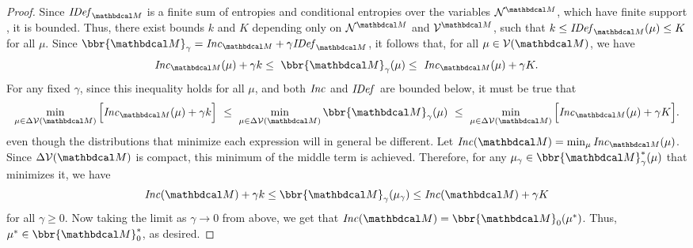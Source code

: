 \begin{proof}
Since $\IDef{\dg M}$ is a finite sum of entropies
and conditional entropies over the variables $\N^{\dg M}$, which have finite support%
, it is bounded.
Thus, there exist bounds $k$ and $K$ depending only on $\N^{\dg M}$ and
$\V^{\dg M}$, such that $\lb \leq \IDef{\dg M}(\mu) \leq \ub$ for all $\mu$.
%
Since $\bbr{\dg M}_\gamma = \Inc_{\dg M} + \gamma \IDef{\dg M}$,
it follows that, for all $\mu \in \V(\dg M)$, we have
\[ \Inc_{\dg M}( \mu) + \gamma\lb \leq~ \bbr{\dg M }_\gamma(\mu) 
\leq~  \Inc_{\dg M}( \mu) + \gamma\ub. \]
For any fixed $\gamma$, since this inequality holds for all $\mu$, and both $\mathit{Inc}$ and $\mathit{IDef}_{}$ are bounded below, it must be true that 
\[
\min_{\mu \in \Delta\V(\dg M)} \Big[ \Inc_{\dg M}( \mu) + \gamma\lb \Big]
~\leq~ \min_{\mu \in \Delta\V(\dg M)}\bbr{\dg M }_\gamma(\mu) ~\leq~  \min_{\mu \in \Delta\V(\dg M)} \Big[ \Inc_{\dg M}( \mu) + \gamma\ub \Big]. \]
even though the distributions that minimize each expression will in general be different.
Let $\Inc(\dg M) = \min_{\mu} \Inc_{\dg M}(\mu)$.
Since $\Delta\V(\dg M)$ is compact, this minimum of the middle term is achieved. 
Therefore, for any $\mu_\gamma \in \bbr{\dg M}^*_\gamma(\mu)$ that minimizes it, we have
$$\Inc(\dg M) +\gamma \lb \le \bbr{\dg M }_\gamma(\mu_\gamma) \le
		 \Inc(\dg M) +\gamma \ub$$ for all $\gamma \ge 0.$
Now taking the limit as $\gamma\rightarrow 0$ from above, we get that
$\Inc(\dg M) = \bbr{\dg M }_0(\mu^*)$.
Thus, $\mu^* \in \bbr{\dg M}_0^*$, as desired.
\end{proof}
